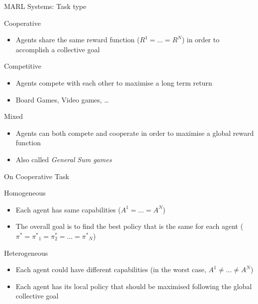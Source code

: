 \documentclass[presentation]{beamer}\mode<presentation>{\usetheme{AMSBolognaFC}}
\begin{document}
\begin{frame}{MARL Systems: Task type}
	\begin{alertblock}{Cooperative}
		\begin{itemize}
			\item Agents share the same reward function ($R^1 = \dots = R^N$) in order to accomplish a collective goal
		\end{itemize}
	\end{alertblock}
	\begin{exampleblock}{Competitive}
		\begin{itemize}
			\item Agents compete with each other to maximise a long term return
			\item Board Games, Video games, \dots
		\end{itemize}
	\end{exampleblock}
	\begin{exampleblock}{Mixed}
		\begin{itemize}
			\item Agents can both compete and cooperate in order to maximise a global reward function
			\item Also called \textit{General Sum games}
		\end{itemize}
	\end{exampleblock}
\end{frame}
\begin{frame}{On Cooperative Task}
	\begin{exampleblock}{Homogeneous}
		\begin{itemize}
			\item Each agent has same capabilities ($A^1 = \dots = A^N$)
			\item The overall goal is to find the best policy that is the same for each agent ($\pi^* = {\pi^{*}}_1 = \pi^{*}_2 = \dots = {\pi^{*}}_N$)
		\end{itemize}
	\end{exampleblock}
	\begin{exampleblock}{Heterogeneous}
		\begin{itemize}
			\item Each agent could have different capabilities (in the worst case, $A^1 \neq \dots \neq A^N$)
			\item Each agent has its local policy that should be maximised following the global collective goal
		\end{itemize}
	\end{exampleblock}
\end{frame}
\end{document}
